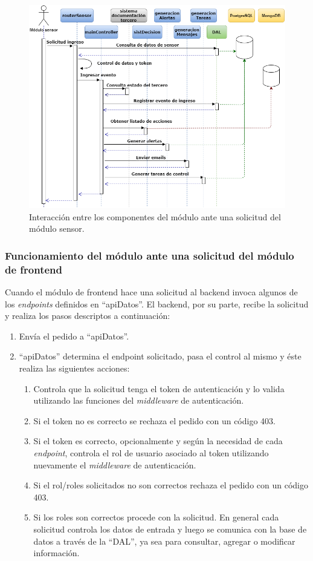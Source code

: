 \begin{figure}[ht]
	\centering
	\includegraphics[width=1\textwidth]{./Figures/DiagramaInteaccion1.png}
	\caption{Interacción entre los componentes del módulo ante una solicitud del módulo sensor.}
	\label{fig:DiagramaInteaccion1}
\end{figure}

\pagebreak
\subsubsection{Funcionamiento del módulo ante una solicitud del módulo de frontend}

Cuando el módulo de frontend hace una solicitud al backend invoca algunos de los \textit{endpoints} definidos en ``apiDatos''. El backend, por su parte, recibe la solicitud y realiza los pasos descriptos a continuación: 
\begin{enumerate}
\item Envía el pedido a ``apiDatos''. 
\item ``apiDatos'' determina el endpoint solicitado, pasa el control al mismo y éste realiza las siguientes acciones:
	\begin{enumerate}
	\item Controla que la solicitud tenga el token de autenticación y lo valida utilizando las funciones del \textit{middleware} de autenticación.
	\item Si el token no es correcto se rechaza el pedido con un código 403.
	\item Si el token es correcto, opcionalmente y según la necesidad de cada \textit{endpoint}, controla el rol de usuario asociado al token utilizando nuevamente el \textit{middleware} de autenticación.
	\item Si el rol/roles solicitados no son correctos rechaza el pedido con un código 403.
	\item Si los roles son correctos procede con la solicitud. En general cada solicitud controla los datos de entrada y luego se comunica con la base de datos a través de la ``DAL'', ya sea para consultar, agregar o modificar información.
	\end{enumerate}

\end{enumerate}

